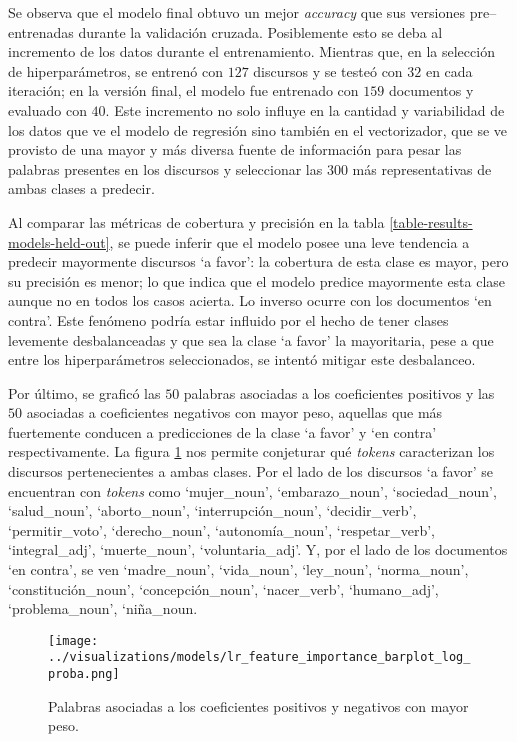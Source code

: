 Se observa que el modelo final obtuvo un mejor \textit{accuracy} que sus
versiones pre{--}entrenadas durante la validaci\'on cruzada. Posiblemente
esto se deba al incremento de los datos durante el entrenamiento.
Mientras que, en la selecci\'on de hiperpar\'ametros, se entren\'o con $127$ discursos
y se teste\'o con $32$ en cada iteraci\'on; en la versi\'on final, el modelo fue entrenado
con $159$ documentos y evaluado con $40$. Este incremento no solo influye en
la cantidad y variabilidad de los datos que ve el modelo de regresi\'on sino
tambi\'en en el vectorizador, que se ve provisto de una mayor y m\'as diversa fuente
de informaci\'on para pesar las palabras presentes en los discursos y seleccionar
las $300$ m\'as representativas de ambas clases a predecir.
\par
Al comparar las m\'etricas de cobertura y precisi\'on en la tabla
\ref{table-results-models-held-out}, se puede inferir que el modelo posee
una leve tendencia a predecir mayormente discursos `a favor': la cobertura
de esta clase es mayor, pero su precisi\'on es menor; lo que indica que el modelo
predice mayormente esta clase aunque no en todos los casos acierta. Lo inverso
ocurre con los documentos `en contra'. Este fen\'omeno podr\'ia estar influido
por el hecho de tener clases levemente desbalanceadas y que sea la clase `a favor'
la mayoritaria, pese a que entre los hiperpar\'ametros seleccionados, se intentó
mitigar este desbalanceo.
\par
Por \'ultimo, se grafic\'o las $50$ palabras asociadas a los coeficientes positivos
y las $50$ asociadas a coeficientes negativos con mayor peso, aquellas que m\'as
fuertemente conducen a predicciones de la clase `a favor' y `en contra' respectivamente.
La figura \ref{fig-results-models-feature-importance} nos permite conjeturar qu\'e
\textit{tokens} caracterizan los discursos pertenecientes a ambas clases. Por el lado de los
discursos `a favor' se encuentran con \textit{tokens} como `mujer\_noun', `embarazo\_noun',
`sociedad\_noun', `salud\_noun', `aborto\_noun', `interrupción\_noun', `decidir\_verb',
`permitir\_voto', `derecho\_noun', `autonom\'ia\_noun', `respetar\_verb', `integral\_adj',
`muerte\_noun', `voluntaria\_adj'. Y, por el lado de los
documentos `en contra', se ven `madre\_noun', `vida\_noun', `ley\_noun', `norma\_noun',
`constituci\'on\_noun', `concepci\'on\_noun', `nacer\_verb',
`humano\_adj', `problema\_noun', `niña\_noun.

\begin{figure}[h!]
    \centering
    \texttt{[image: ../visualizations/models/lr\_feature\_importance\_barplot\_log\_proba.png]}
    \caption{Palabras asociadas a los coeficientes positivos y negativos con mayor peso.}
    \label{fig-results-models-feature-importance}
\end{figure}